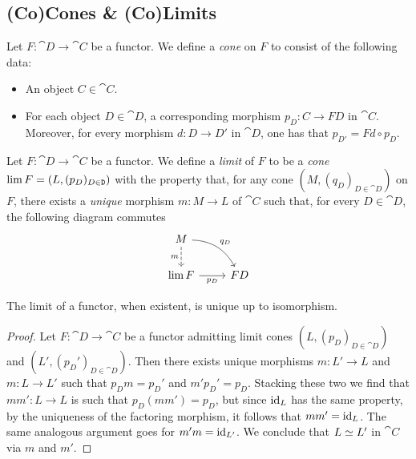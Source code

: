\subsection{(Co)Cones \& (Co)Limits}

\begin{definition}[Cone]
\label{def:cone-on-functor}
Let \(F: \cat D \to \cat C\) be a functor. We define a \emph{cone} on \(F\) to
consist of the following data:
\begin{itemize}\setlength\itemsep{0em}
\item An object \(C \in \cat C\).
\item For each object \(D \in \cat D\), a corresponding morphism \(p_D: C \to F
  D\) in \(\cat C\). Moreover, for every morphism \(d: D \to D'\) in \(\cat D\),
  one has that \(p_{D'} = F d \circ p_D\).
\end{itemize}
\end{definition}

\begin{definition}
\label{def:limit-of-functor}
Let \(F: \cat D \to \cat C\) be a functor. We define a \emph{limit} of \(F\) to
be a \emph{cone} \(\operatorname{lim} F = (L, (p_{D})_{D \in \texttt D})\) with the property
that, for any cone \((M, (q_D)_{D \in \cat D})\) on \(F\), there exists a
\emph{unique} morphism \(m: M \to L\) of \(\cat C\) such that, for every
\(D \in \cat D\), the following diagram commutes
\[
\begin{tikzcd}
M \ar[d, dashed, "m"'] \ar[rd, bend left, "q_D"] & \\
\Lim F \ar[r, "p_D"'] &F D
\end{tikzcd}
\]
\end{definition}

\begin{proposition}[Uniqueness]
\label{prop:limit-functor-uniqueness}
The limit of a functor, when existent, is unique up to isomorphism.
\end{proposition}

\begin{proof}
Let \(F: \cat D \to \cat C\) be a functor admitting limit cones
\((L, (p_D)_{D \in \cat D})\) and \((L', (p_D')_{D \in \cat D})\). Then there
exists unique morphisms \(m: L' \to L\) and \(m: L \to L'\) such that
\(p_D m = p_D'\) and \(m' p_D' = p_D\). Stacking these two we find that
\(m m': L \to L\) is such that \(p_D (m m') = p_D\), but since \(\operatorname{id}_L\) has the
same property, by the uniqueness of the factoring morphism, it follows that
\(m m' = \operatorname{id}_L\). The same analogous argument goes for \(m' m = \operatorname{id}_{L'}\). We
conclude that \(L \simeq L'\) in \(\cat C\) via \(m\) and \(m'\).
\end{proof}

